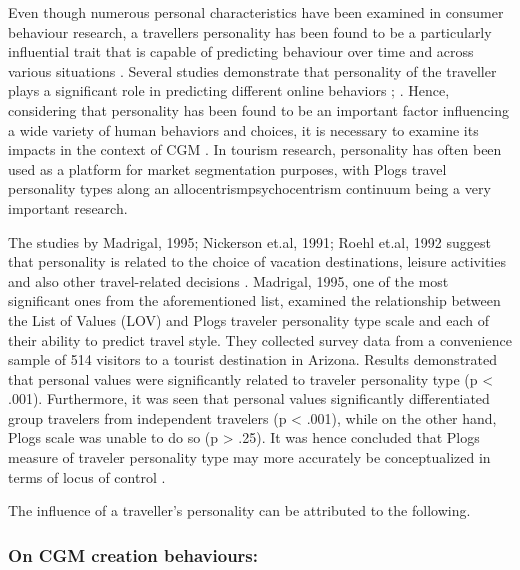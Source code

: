 Even though numerous personal characteristics have been examined in consumer behaviour research, a traveller\textquotesingle s personality has been found to be a particularly influential trait that is capable of predicting behaviour over time and across various situations \cite{woszczynski2002exploring}. Several studies demonstrate that personality of the traveller plays a significant role in predicting different online behaviors\cite{yoo2011influence} \cite{acar2007online}; \cite{tuten2001understanding}. Hence, considering that personality has been found to be an important factor influencing a wide variety of human behaviors and choices, it is necessary to examine its impacts in the context of CGM \cite{yoo2011influence}. In tourism research, personality has often been used as a platform for market segmentation purposes, with Plog\textquotesingle s travel personality types along an allocentrism\textemdash psychocentrism continuum being a very important research\cite{plog1973destination}\cite{yoo2011influence}.

The studies by Madrigal, 1995; Nickerson et.al, 1991; Roehl et.al, 1992 suggest that personality is related to the choice of vacation destinations, leisure activities and also other travel-related decisions \cite{madrigal1995personal}\cite{nickerson1991traveler}\cite{roehl1992risk}. Madrigal, 1995, one of the most significant ones from the aforementioned list, examined the relationship between the List of Values (LOV) and Plog\textquotesingle s traveler personality type scale and each of their ability to predict travel style. They collected survey data from a convenience sample of 514 visitors to a tourist destination in Arizona. Results demonstrated that personal values were significantly related to traveler personality type (p < .001). Furthermore, it was seen that personal values significantly differentiated group travelers from independent travelers (p < .001), while on the other hand, Plog\textquotesingle s scale was unable to do so (p > .25). It was hence concluded that Plog\textquotesingle s measure of traveler personality type may more accurately be conceptualized in terms of locus of control \cite{madrigal1995personal}.

The influence of a traveller's personality can be attributed to the following. 

\subsubsection{On CGM creation behaviours: }

